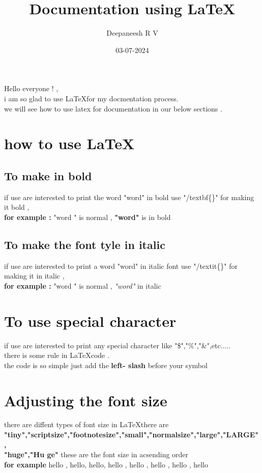 \documentclass[a4paper,12pt]{article}
\title{Documentation using \LaTeX}
\author{Deepaneesh R V }
\date{03-07-2024}
\begin{document}
	\maketitle
	Hello everyone ! , \\
	i am so glad to use \LaTeX for my docmentation process.\\
	we will see how to use latex for documentation in our below sections .
	
	\section{how to use \LaTeX}
	\subsection{To make in bold}
	if use are interested to print the word "word" in bold use "/textbf\{\}" for making it bold ,\\
	\textbf{for example :} "word " is normal , \textbf{"word"} is in bold
	\subsection{To make the font tyle in italic}
	if use are interested to print a word "word" in italic font use "/textit\{\}" for making it in italic
	,\\
	\textbf{for example :} "word " is normal , \textit{"word"} in italic
	\section{To use special character}
	if use are interested to print any special character like "\$","\%","\&",etc..... \\
	there is some rule in \LaTeX code .\\
	the code is so simple just add the \textbf{left- slash } before your symbol
	\pagebreak
	\section{Adjusting the font size}
	there are diffent types of font size in \LaTeX there are \\
	\textbf{"tiny","scriptsize","footnotesize","small","normalsize","large","LARGE",\\"huge","Hu
		ge"}
	these are the font size in acsending order \\
	\textbf{for example} \tiny hello , \scriptsize hello, \footnotesize hello, \normalsize hello ,
	\large hello ,
	\LARGE hello , \huge hello , \Huge {hello }
\end{document}
